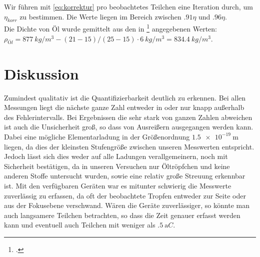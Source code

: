 Wir führen mit \cref{eq:korrektur} pro beobachtetes Teilchen eine Iteration durch, um $\eta_{korr}$ zu bestimmen. Die Werte liegen im Bereich zwischen $\num{.91}\eta$ und $\num{.96}\eta$. \\

Die Dichte von Öl wurde gemittelt aus den in \footcite{anleitung-ws2014} angegebenen Werten: $\rho_{Öl}=\SI{877}{kg/m^3}-(21-15)/(25-15)\cdot \SI{6}{kg/m^3}=\SI{834.4}{kg/m^3}$.

\section{Diskussion}
Zumindest qualitativ ist die Quantifizierbarkeit deutlich zu erkennen. Bei allen Messungen liegt die nächste ganze Zahl entweder in oder nur knapp außerhalb des Fehlerintervalls. Bei Ergebnissen die sehr stark von ganzen Zahlen abweichen ist auch die Unsicherheit groß, so dass von Ausreißern ausgegangen werden kann. Dabei eine mögliche Elementarladung in der Größenordnung $ \SI{1.5e-19}{\meter} $ liegen, da dies der kleinsten Stufengröße zwischen unseren Messwerten entspricht. Jedoch lässt sich dies weder auf alle Ladungen verallgemeinern, noch mit Sicherheit bestätigen, da in unseren Versuchen nur Öltröpfchen und keine anderen Stoffe untersucht wurden, sowie eine relativ große Streuung erkennbar ist. Mit den verfügbaren Geräten war es mitunter schwierig die Messwerte zuverlässig zu erfassen, da oft der beobachtete Tropfen entweder zur Seite oder aus der Fokusebene verschwand. Wären die Geräte zuverlässiger, so könnte man auch langsamere Teilchen betrachten, so dass die Zeit genauer erfasst werden kann und eventuell auch Teilchen mit weniger als $ \SI{.5}{\atto C} $.